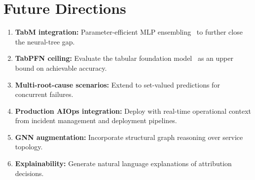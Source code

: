 \documentclass[12pt,a4paper]{report}
\begin{document}
\section{Future Directions}

\begin{enumerate}
    \item \textbf{TabM integration:} Parameter-efficient MLP ensembling~\cite{gorishniy2025tabm} to further close the neural-tree gap.
    \item \textbf{TabPFN ceiling:} Evaluate the tabular foundation model~\cite{hollmann2024tabpfn} as an upper bound on achievable accuracy.
    \item \textbf{Multi-root-cause scenarios:} Extend to set-valued predictions for concurrent failures.
    \item \textbf{Production AIOps integration:} Deploy with real-time operational context from incident management and deployment pipelines.
    \item \textbf{GNN augmentation:} Incorporate structural graph reasoning over service topology.
    \item \textbf{Explainability:} Generate natural language explanations of attribution decisions.
\end{enumerate}
\end{document}
